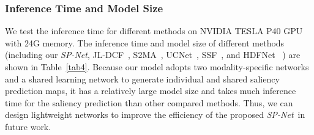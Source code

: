 \documentclass[10pt,twocolumn,letterpaper]{article}
\def\ours{\emph{SP-Net}}
\begin{document}
\subsubsection{Inference Time and Model Size}

We test the inference time for different methods on NVIDIA TESLA P40 GPU with 24G memory. The inference time and model size of different methods (including our \ours, JL-DCF~\cite{fu2020jl}, S2MA~\cite{liu2020}, UCNet~\cite{zhang2020uc}, SSF~\cite{zhang2020}, and  HDFNet~\cite{paneccv2020} ) are shown in Table~\ref{tab4}. Because our model adopts two modality-specific networks and a shared learning network to generate individual and shared saliency prediction maps, it has a relatively large model size and takes much inference time for the saliency prediction than other compared methods. Thus, we can design lightweight networks to improve the efficiency of the proposed \ours~in future work.
\end{document}
